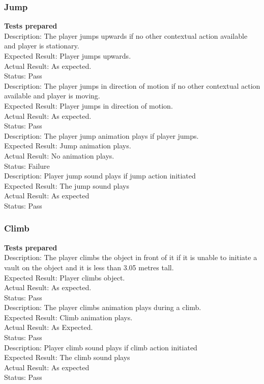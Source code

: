 \documentclass[11pt,a4paper]{article}
\begin{document}
\subsubsection{Jump}
\textbf{Tests prepared}\\
Description: The player jumps upwards if no other contextual action available and player is stationary. \\
Expected Result: Player jumps upwards.\\
Actual Result:  As expected.\\
Status: Pass
\smallskip\\
Description: The player jumps in direction of motion if no other contextual action available and player is moving. \\
Expected Result: Player jumps in direction of motion.\\
Actual Result: As expected.\\
Status: Pass
\smallskip\\
Description: The player jump animation plays if player jumps. \\
Expected Result: Jump animation plays.\\
Actual Result:  No animation plays.\\
Status: Failure
\smallskip\\
Description: Player jump sound plays if jump action initiated\\
Expected Result: The jump sound plays\\
Actual Result:  As expected\\
Status: Pass
\subsubsection{Climb}
\textbf{Tests prepared}\\
Description: The player climbs the object in front of it if it is unable to initiate a vault on the object and it is less than 3.05 metres tall. \\
Expected Result: Player climbs object.\\
Actual Result: As expected.\\
Status: Pass
\smallskip\\
Description: The player climbs animation plays during a climb. \\
Expected Result: Climb animation plays.\\
Actual Result:  As Expected.\\
Status: Pass
\smallskip\\
Description: Player climb sound plays if climb action initiated\\
Expected Result: The climb sound plays\\
Actual Result:  As expected\\
Status: Pass
\end{document}
